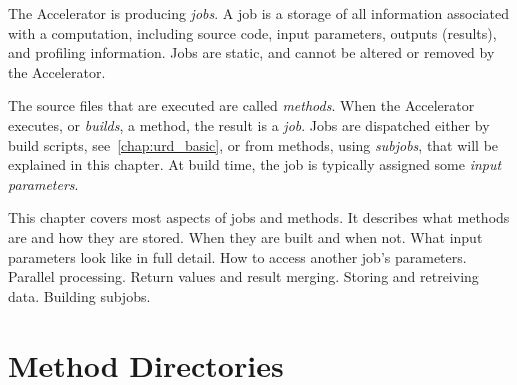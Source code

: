 

The Accelerator is producing \emph{jobs}.  A job is a storage of all
information associated with a computation, including source code,
input parameters, outputs (results), and profiling information.  Jobs
are static, and cannot be altered or removed by the Accelerator.

The source files that are executed are called \emph{methods}.  When
the Accelerator executes, or \emph{builds}, a method, the result is
a \emph{job}.  Jobs are dispatched either by build scripts,
see~\ref{chap:urd_basic}, or from methods, using \emph{subjobs}, that will be
explained in this chapter.  At build time, the job is typically
assigned some \emph{input parameters}.

This chapter covers most aspects of jobs and methods.  It describes
what methods are and how they are stored.  When they are built and
when not.  What input parameters look like in full detail.  How to
access another job's parameters.  Parallel processing.  Return values
and result merging.  Storing and retreiving data.  Building subjobs.


\section{Method Directories}

